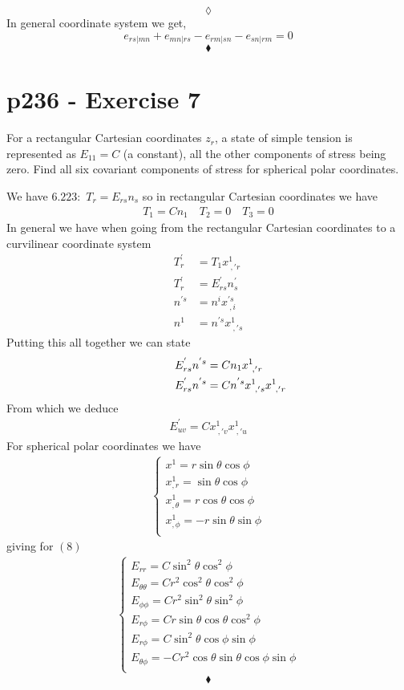 $$\lozenge$$
In general coordinate system we get, 
$$ e_{rs|mn}+e_{mn|rs}-e_{rm|sn}-e_{sn|rm}=0$$
$$\blacklozenge$$
\newpage



\section{p236 - Exercise 7}
\begin{tcolorbox}
For a rectangular Cartesian coordinates $z_r$, a state of simple tension is represented as $E_{11}=C$ (a constant), all the other components of stress being zero. Find all six covariant components of stress for spherical polar coordinates. 
\end{tcolorbox}
We have $\mathbf{6.223}:$ $T_r=E_{rs}n_s$ so in rectangular Cartesian coordinates we have
\begin{align}
T_1= Cn_1 \quad T_2=0\quad T_3=0
\end{align}
In general we have when going from the rectangular Cartesian coordinates to a curvilinear coordinate system
\begin{align}
T^{'}_r&= T_1x^1_{\ ,'r} \\
T^{'}_r&=E^{'}_{rs}n^{'}_s\\
n^{'s}&= n^{i}x^{'s}_{\ ,i}\\
n^{1}&= n^{'s}x^{1}_{\ ,'s}
\end{align}
Putting this all together we can state
\begin{align}
&E^{'}_{rs}n^{'s}= Cn_1x^{1}_{\ ,'r}\\
\quad\quad\quad\quad &E^{'}_{rs}n^{'s}= Cn^{'s}x^{1}_{\ ,'s}x^{1}_{\ ,'r}
\end{align}
From which we deduce
\begin{align}
E^{'}_{uv}=Cx^{1}_{\ ,'v}x^{1}_{\ ,'u}
\end{align}
For spherical polar coordinates we have
\begin{align}
\left\{\begin{array}{l}
x^1= r\sin\theta\cos\phi\\
x^1_{,r}= \sin\theta\cos\phi\\
x^1_{,\theta}= r\cos\theta\cos\phi\\
x^1_{,\phi}= -r\sin\theta\sin\phi\\
\end{array}\right.
\end{align}
giving for $(8)$
\begin{align}
\left\{\begin{array}{l}
E_{rr}= C\sin^2\theta\cos^2\phi\\
E_{\theta\theta}= Cr^2\cos^2\theta\cos^2\phi\\
E_{\phi\phi}= Cr^2\sin^2\theta\sin^2\phi\\
E_{r\phi}= Cr\sin\theta\cos\theta\cos^2\phi
\\E_{r\phi}= C\sin^2\theta\cos\phi\sin\phi\\
E_{\theta\phi}= -Cr^2\cos\theta\sin\theta\cos\phi\sin\phi\\
\end{array}\right.
\end{align}
$$\blacklozenge$$
\newpage



